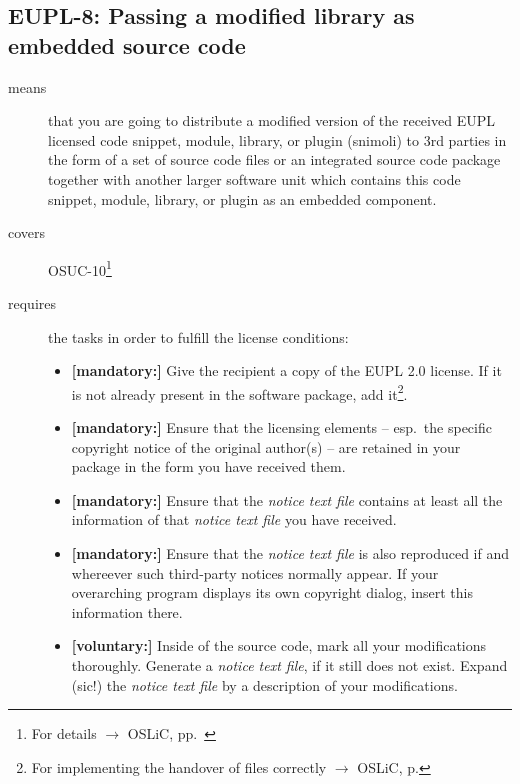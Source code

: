 \subsection{EUPL-8: Passing a modified library as embedded source code}
\label{OSUC-10-EUPL}

\begin{description}
\item[means] that you are going to distribute a modified version of the received
EUPL licensed code snippet, module, library, or plugin (snimoli) to 3rd
parties in the form of a set of source code files or an integrated source code
package together with another larger software unit which contains this code
snippet, module, library, or plugin as an embedded component.
\item[covers] OSUC-10\footnote{For details $\rightarrow$ OSLiC, pp.\ \pageref{OSUC-10-DEF}}
\item[requires] the tasks in order to fulfill the license conditions:
\begin{itemize}
  
  \item \textbf{[mandatory:]} Give the recipient a copy of the EUPL 2.0
  license. If it is not already present in the software package, add
  it\footnote{For implementing the handover of files correctly $\rightarrow$
  OSLiC, p. \pageref{DistributingFilesHint}}.

  \item \textbf{[mandatory:]} Ensure that the licensing elements -- esp.\ the
  specific copyright notice of the original author(s) -- are retained in your
  package in the form you have received them.
  
  \item \textbf{[mandatory:]} Ensure that the \emph{notice text file} contains at least
  all the information of that \emph{notice text file} you have received.
 
  \item \textbf{[mandatory:]} Ensure that the \emph{notice text file} is also
  reproduced if and whereever such third-party notices normally appear. If your
  overarching program displays its own copyright dialog, insert this information
  there.
 
  \item \textbf{[voluntary:]} Inside of the source code, mark all your
  modifications thoroughly. Generate a \emph{notice text file}, if it still does not
  exist. Expand (sic!) the \emph{notice text file} by a description of your
  modifications.
  

\end{itemize}
\end{description}
